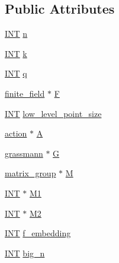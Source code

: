 \subsection*{Public Attributes}
\begin{DoxyCompactItemize}
\item 
\mbox{\hyperlink{galois_8h_a09fddde158a3a20bd2dcadb609de11dc}{I\+NT}} \mbox{\hyperlink{classaction__on__grassmannian_a4484006739d0c3629cd5c8ec7fbea1b1}{n}}
\item 
\mbox{\hyperlink{galois_8h_a09fddde158a3a20bd2dcadb609de11dc}{I\+NT}} \mbox{\hyperlink{classaction__on__grassmannian_aaaf5bdebbcde55f86201c295baca641f}{k}}
\item 
\mbox{\hyperlink{galois_8h_a09fddde158a3a20bd2dcadb609de11dc}{I\+NT}} \mbox{\hyperlink{classaction__on__grassmannian_a4dbe68ea88bf3bc3eeee1dfa203b3bee}{q}}
\item 
\mbox{\hyperlink{classfinite__field}{finite\+\_\+field}} $\ast$ \mbox{\hyperlink{classaction__on__grassmannian_ac3339cb69fdd9e81dc5ca2c0da1b081f}{F}}
\item 
\mbox{\hyperlink{galois_8h_a09fddde158a3a20bd2dcadb609de11dc}{I\+NT}} \mbox{\hyperlink{classaction__on__grassmannian_aaa588ce5327aede871e37617d09e71ee}{low\+\_\+level\+\_\+point\+\_\+size}}
\item 
\mbox{\hyperlink{classaction}{action}} $\ast$ \mbox{\hyperlink{classaction__on__grassmannian_a2a584206e8f65bb6d70b2830ac09a617}{A}}
\item 
\mbox{\hyperlink{classgrassmann}{grassmann}} $\ast$ \mbox{\hyperlink{classaction__on__grassmannian_aa823614b80dec801f8582d20648418f0}{G}}
\item 
\mbox{\hyperlink{classmatrix__group}{matrix\+\_\+group}} $\ast$ \mbox{\hyperlink{classaction__on__grassmannian_a85f7387f6cbf094df06ae9aab69170db}{M}}
\item 
\mbox{\hyperlink{galois_8h_a09fddde158a3a20bd2dcadb609de11dc}{I\+NT}} $\ast$ \mbox{\hyperlink{classaction__on__grassmannian_a1958b759d03506bf86af48f8542dac5f}{M1}}
\item 
\mbox{\hyperlink{galois_8h_a09fddde158a3a20bd2dcadb609de11dc}{I\+NT}} $\ast$ \mbox{\hyperlink{classaction__on__grassmannian_a16a546fa2ba390b76efe4df454e73bab}{M2}}
\item 
\mbox{\hyperlink{galois_8h_a09fddde158a3a20bd2dcadb609de11dc}{I\+NT}} \mbox{\hyperlink{classaction__on__grassmannian_a8bcdc7beb24237cc30aedd9636d6f18f}{f\+\_\+embedding}}
\item 
\mbox{\hyperlink{galois_8h_a09fddde158a3a20bd2dcadb609de11dc}{I\+NT}} \mbox{\hyperlink{classaction__on__grassmannian_ab623520bc0f354f90d00d94724268662}{big\+\_\+n}}

\end{DoxyCompactItemize}
